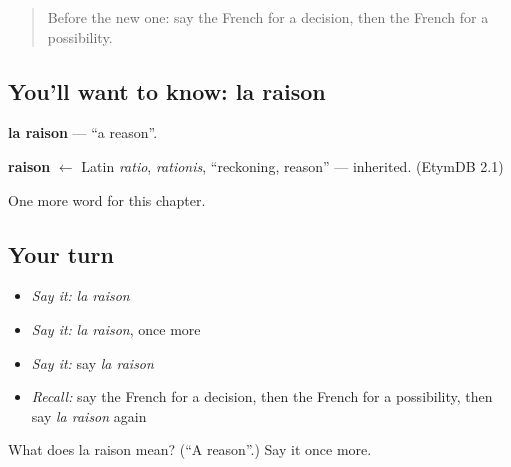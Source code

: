 \label{lesson:FR-C225-raison}



\begin{quote}
Before the new one: say the French for a decision, then the French for a possibility.
\end{quote}

\subsection*{You'll want to know: la raison}
\textbf{la raison} — \textquotedblleft{}a reason\textquotedblright{}.

\begin{cousinweb}
\textbf{raison} $\leftarrow$ Latin \emph{ratio}, \emph{rationis}, \textquotedblleft{}reckoning, reason\textquotedblright{} — inherited. (EtymDB 2.1)
\end{cousinweb}

\begin{grammarlens}[title={What you've built}]
One more word for this chapter.
\end{grammarlens}

\subsection*{Your turn}
\begin{itemize}
\raggedright
  \item \emph{Say it:} \emph{la raison}
  \item \emph{Say it:} \emph{la raison}, once more
  \item \emph{Say it:} say \emph{la raison}
  \item \emph{Recall:} say the French for a decision, then the French for a possibility, then say \emph{la raison} again
\end{itemize}

\begin{tcolorbox}[breakable,colback=teal!4,colframe=teal!35!black,title={Before you move on}]
What does la raison mean? (\textquotedblleft{}A reason\textquotedblright{}.) Say it once more.
\end{tcolorbox}
